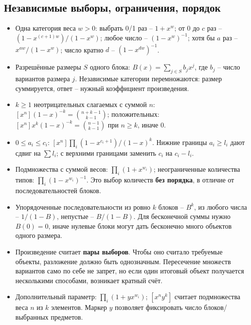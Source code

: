 \subsection{Независимые выборы, ограничения, порядок}
\begin{itemize}[leftmargin=*, nosep]
\item Одна категория веса $w>0$: выбрать 0/1 раз -- $1+x^w$; от 0 до $c$ раз -- $(1-x^{(c+1)w})/(1-x^w)$; любое число -- $(1-x^w)^{-1}$; хотя бы $a$ раз -- $x^{aw}/(1-x^w)$; число кратно $d$ -- $(1-x^{dw})^{-1}$.
\item Разрешённые размеры $S$ одного блока: $B(x)=\sum_{j\in S}b_jx^j$, где $b_j$ -- число вариантов размера $j$. Независимые категории перемножаются: размер суммируется, ответ -- нужный коэффициент произведения.
\item $k\ge1$ неотрицательных слагаемых с суммой $n$: $[x^n](1-x)^{-k}=\binom{n+k-1}{k-1}$; положительных: $[x^n]x^k(1-x)^{-k}=\binom{n-1}{k-1}$ при $n\ge k$, иначе 0.
\item $0\le a_i\le c_i$: $[x^n]\prod_i(1-x^{c_i+1})/(1-x)^k$. Нижние границы $a_i\ge l_i$ дают сдвиг на $\sum l_i$; с верхними границами заменить $c_i$ на $c_i-l_i$.
\item Подмножества с суммой весов: $\prod_i(1+x^{w_i})$; неограниченные количества типов: $\prod_i(1-x^{w_i})^{-1}$. Это выбор количеств \textbf{без порядка}, в отличие от последовательностей блоков.
\item Упорядоченные последовательности из ровно $k$ блоков -- $B^k$, из любого числа -- $1/(1-B)$, непустые -- $B/(1-B)$. Для бесконечной суммы нужно $B(0)=0$, иначе нулевые блоки могут дать бесконечно много объектов одного размера.
\item Произведение считает \textbf{пары выборов}. Чтобы оно считало требуемые объекты, разложение должно быть однозначным. Пересечение множеств вариантов само по себе не запрет, но если один итоговый объект получается несколькими способами, возникает кратный счёт.
\item Дополнительный параметр: $\prod_i(1+yx^{w_i})$; $[x^ny^k]$ считает подмножества веса $n$ из $k$ элементов. Маркер $y$ позволяет фиксировать число блоков/выбранных предметов.
\end{itemize}

